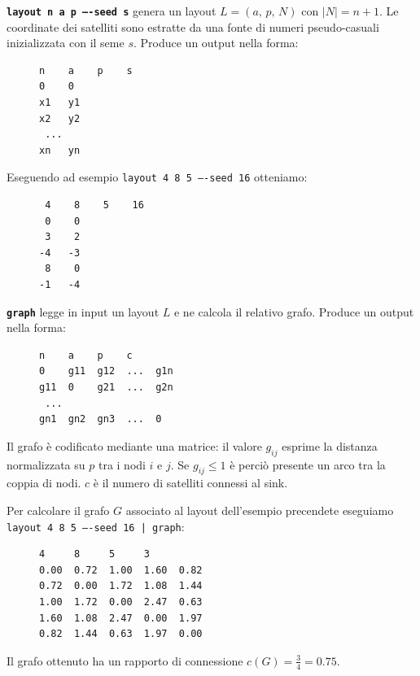 \documentclass[a4paper,12pt]{article}
\theoremstyle{definition}
\begin{document}
\texttt{\textbf{layout n a p ----seed s}} genera un layout $L = (a,\,p,\,N)$ con $|N| = n+1$. Le coordinate dei satelliti sono estratte da una fonte di numeri pseudo-casuali inizializzata con il seme $s$. Produce un output nella forma:

\begin{figure}[H]
\centering
\begin{BVerbatim}
n    a    p    s
0    0
x1   y1
x2   y2
 ...
xn   yn
\end{BVerbatim}
\end{figure}

Eseguendo ad esempio \texttt{layout 4 8 5 ----seed 16} otteniamo:

\begin{figure}[H]
\centering
\begin{BVerbatim}
 4    8    5    16
 0    0
 3    2
-4   -3
 8    0
-1   -4
\end{BVerbatim}
\end{figure}

\texttt{\textbf{graph}} legge in input un layout $L$ e ne calcola il relativo grafo. Produce un output nella forma:

\begin{figure}[H]
\centering
\begin{BVerbatim}
n    a    p    c
0    g11  g12  ...  g1n
g11  0    g21  ...  g2n
 ...
gn1  gn2  gn3  ...  0
\end{BVerbatim}
\end{figure}

Il grafo è codificato mediante una matrice: il valore $g_{ij}$ esprime la distanza normalizzata su $p$ tra i nodi $i$ e $j$. Se $g_{ij} \leq 1$ è perciò presente un arco tra la coppia di nodi. $c$ è il numero di satelliti connessi al sink.

Per calcolare il grafo $G$ associato al layout dell'esempio precendete eseguiamo \texttt{layout 4 8 5 ----seed 16 | graph}:

\begin{figure}[H]
\centering
\begin{BVerbatim}
4     8     5     3
0.00  0.72  1.00  1.60  0.82 
0.72  0.00  1.72  1.08  1.44 
1.00  1.72  0.00  2.47  0.63 
1.60  1.08  2.47  0.00  1.97 
0.82  1.44  0.63  1.97  0.00 
\end{BVerbatim}
\end{figure}

Il grafo ottenuto ha un rapporto di connessione $c(G) = \frac{3}{4} = 0.75$.

\end{document}
